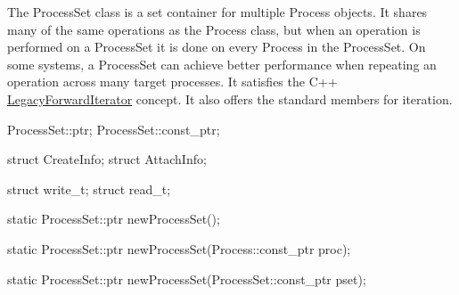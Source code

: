 
The ProcessSet class is a set container for multiple
Process objects. It shares many of the same operations as the Process class,
but when an operation is performed on a ProcessSet it is done on every Process
in the ProcessSet. On some systems, a ProcessSet can
achieve better performance when repeating an operation across many target
processes. It satisfies the C++
\href{https://en.cppreference.com/cpp/named_req/ForwardIterator}{LegacyForwardIterator}
concept. It also offers the standard  members for iteration.

\begin{apient}
  ProcessSet::ptr;
  ProcessSet::const_ptr;
\end{apient}


\begin{apient}
  struct CreateInfo;
  struct AttachInfo;
\end{apient}


\begin{apient}
  struct write_t;
  struct read_t;
\end{apient}


\begin{apient}
  static ProcessSet::ptr newProcessSet();
\end{apient}


\begin{apient}
  static ProcessSet::ptr newProcessSet(Process::const_ptr proc);
\end{apient}


\begin{apient}
  static ProcessSet::ptr newProcessSet(ProcessSet::const_ptr pset);
\end{apient}


